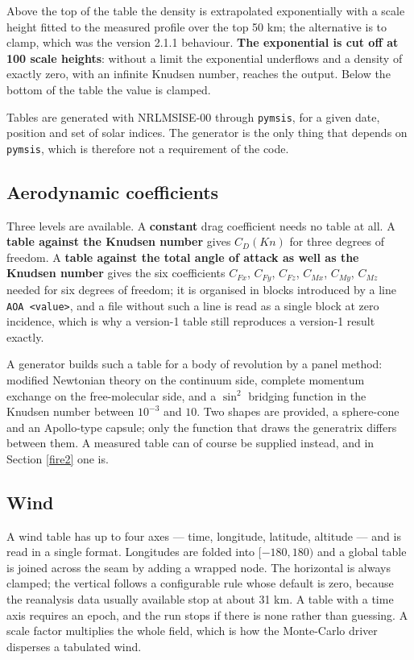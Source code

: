 \documentclass[11pt,a4paper]{article}
\begin{document}
Above the top of the table the density is extrapolated exponentially with a scale height
fitted to the measured profile over the top 50 km; the alternative is to clamp, which was
the version 2.1.1 behaviour. \textbf{The exponential is cut off at 100 scale heights}:
without a limit the exponential underflows and a density of exactly zero, with an infinite
Knudsen number, reaches the output. Below the bottom of the table the value is clamped.

Tables are generated with NRLMSISE-00 through \texttt{pymsis}, for a given date, position
and set of solar indices. The generator is the only thing that depends on \texttt{pymsis},
which is therefore not a requirement of the code.

\subsection{Aerodynamic coefficients}

Three levels are available. A \textbf{constant} drag coefficient needs no table at all. A
\textbf{table against the Knudsen number} gives $C_D(Kn)$ for three degrees of freedom. A
\textbf{table against the total angle of attack as well as the Knudsen number} gives the
six coefficients $C_{Fx}$, $C_{Fy}$, $C_{Fz}$, $C_{Mx}$, $C_{My}$, $C_{Mz}$ needed for six
degrees of freedom; it is organised in blocks introduced by a line \texttt{AOA <value>}, and a file
without such a line is read as a single block at zero incidence, which is why a version-1
table still reproduces a version-1 result exactly.

A generator builds such a table for a body of revolution by a panel method: modified
Newtonian theory on the continuum side, complete momentum exchange on the free-molecular
side, and a $\sin^2$ bridging function in the Knudsen number between $10^{-3}$ and $10$.
Two shapes are provided, a sphere-cone and an Apollo-type capsule; only the function that
draws the generatrix differs between them. A measured table can of course be supplied
instead, and in Section \ref{fire2} one is.

\subsection{Wind}

A wind table has up to four axes --- time, longitude, latitude, altitude --- and is read
in a single format. Longitudes are folded into $[-180, 180)$ and a global table is joined
across the seam by adding a wrapped node. The horizontal is always clamped; the vertical
follows a configurable rule whose default is zero, because the reanalysis data usually
available stop at about 31 km. A table with a time axis requires an epoch, and the run
stops if there is none rather than guessing. A scale factor multiplies the whole field,
which is how the Monte-Carlo driver disperses a tabulated wind.
\end{document}
